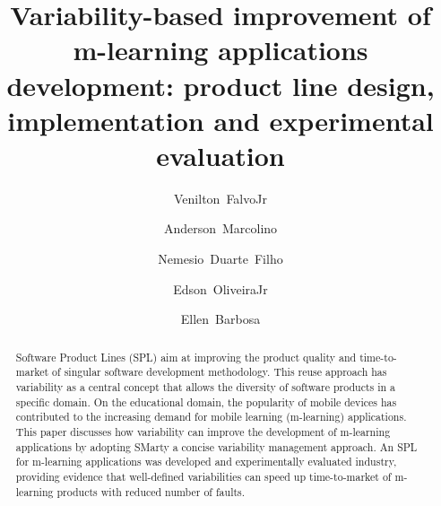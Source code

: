 \documentclass[preprint,12pt]{elsarticle}
\begin{document}
\begin{frontmatter}



\title{Variability-based improvement of m-learning applications development: product line design, implementation and experimental evaluation}


\author[usp]{Venilton~FalvoJr}
\author[usp]{Anderson~Marcolino}
\author[usp]{Nemesio~Duarte~Filho}
\author[uem]{Edson~OliveiraJr}
\author[usp]{Ellen~Barbosa}


\address[usp]{University of Sao Paulo (USP), Brazil}
\address[uem]{State University of Maringa (UEM), Brazil}

\begin{abstract}
Software Product Lines (SPL) aim at improving the product quality and time-to-market of singular software development methodology. This reuse approach has variability as a central concept that allows the diversity of software products in a specific domain. On the educational domain, the popularity of mobile devices has contributed to the increasing demand for mobile learning (m-learning) applications. This paper discusses how variability can improve the development of m-learning applications by adopting SMarty a concise variability management approach. An SPL for m-learning applications was developed and experimentally evaluated industry, providing evidence that well-defined variabilities can speed up time-to-market of m-learning products with reduced number of faults.
\end{abstract}


\end{frontmatter}
\end{document}
